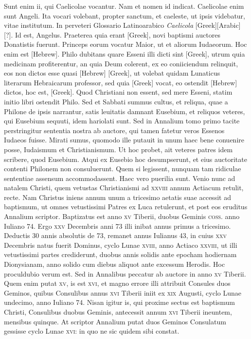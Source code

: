 Sunt enim ii, qui Caelicolae
vocantur.
Nam et nomen id indicat.
Caelicolae enim sunt
Angeli.
Ita vocari volebant, propter sanctum, et caeleste, ut ipsis videbatur,
vitae institutum.
In perveteri Glossario Latinoarabico \textit{Caelicola}
[Greek][Arabic][?].
Id est, Angelus.
Praeterea quia erant \textgreek{[Greek]}, novi
baptismi auctores Donatistis fuerunt.
Princeps eorum vocatur
Maior, ut et aliorum Iudaeorum.
Hoc enim est \texthebrew{[Hebrew]}.
Philo dubitans
quare Esseni illi dicti sint \textgreek{[Greek]},
 utrum quia medicinam profiterentur,
an quia Deum colerent, ex eo coniiciendum relinquit,
eos non dictos esse quasi \texthebrew{[Hebrew]} \textgreek{[Greek]},
 ut volebat quidam Lunaticus
literarum Hebraicarum professor, sed quia \textgreek{[Greek]} vocat, eo ostendit
\texthebrew{[Hebrew]} dictos, hoc est, \textgreek{[Greek]}.
Quod Christiani non essent, sed
mere Esseni, statim initio libri ostendit Philo.
Sed et Sabbati summus
cultus, et reliqua, quae a Philone de ipsis narrantur, satis leuitatis
damnant Eusebium, et reliquos veteres, qui Eusebium sequuti,
idem hariolati sunt.
Sed in Annalium tomo primo tacite perstringitur
sententia nostra ab auctore, qui tamen fatetur veros Essenos Iudaeos
fuisse.
Mirati sumus, quomodo ille putauit in unum haec bene
conuenire posse, Iudaismum et Christianismum.
Ut hoc probet, ait
veteres patres idem scribere, quod Eusebium.
Atqui ex Eusebio
hoc desumpserunt, et eius auctoritate contenti Philonem non consuluerunt.
Quem si legissent, nunquam tam ridiculae sententiae assensum
accommodassent.
Haec vero puerilia sunt.
Venio nunc ad natalem
Christi, quem vetustas Christianismi ad \textsc{xxviii} annum Actiacum
retulit, recte.
Nam Christus iniens annum unum a tricesimo
aetatis suae accessit ad baptismum, ut omnes vetustissimi Patres ex
Luca retulerunt, et post eos eruditus Annalium scriptor.
Baptizatus est anno \textsc{xv} Tiberii, duobus Geminis
 \textsc{coss}. anno Iuliano 74.
Ergo \textsc{xxv} Decembris anni 73 illi inibat annus
 primus a tricesimo.
Deductis 30 annis absolutis de 73, remanet annus Iulianus
43, in cuius \textsc{xxv} Decembris natus fuerit Dominus, cyclo Lunae
\textsc{xviii}, anno Actiaco \textsc{xxviii},
 ut illi vetustissimi partes crediderunt,
duobus annis solidis ante epocham hodiernam Dionysianam,
anno solido cum diebus aliquot ante excessum Herodis.
Hoc proculdubio
verum est.
Sed in Annalibus peccatur ab auctore in anno
\textsc{xv} Tiberii.
Quem enim putat \textsc{xv}, is est \textsc{xvi}, et magno errore illi
attribuit Consules duos Geminos, quibus Consulibus annus \textsc{xvi}
Tiberii iniit ex \textsc{xix} Augusti, cyclo Lunae undecimo, anno Iuliano
74.
Nisan igitur is, qui proxime sectus est baptismum Christi,
Consulibus duobus Geminis, antecessit annum \textsc{xvi} Tiberii ineuntem,
mensibus quinque.
{}
At scriptor Annalium putat duos Geminos
Consulatum gessisse cyclo Lunae \textsc{xvi}: in quo ne sic quidem
sibi constat.

